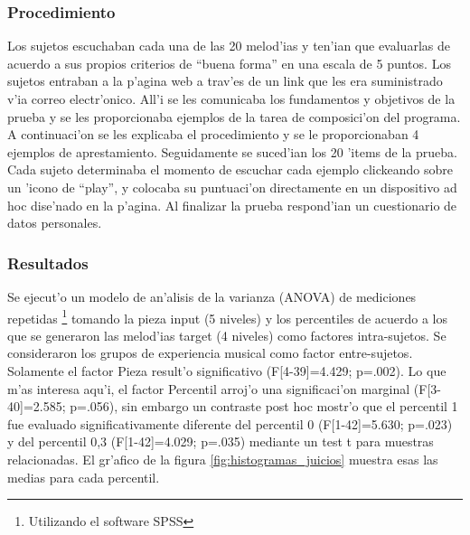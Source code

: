 \subsubsection{Procedimiento}
Los sujetos escuchaban cada una de las 20 melod'ias y ten'ian que evaluarlas de acuerdo a sus propios criterios de ``buena forma'' en una escala de 5 puntos. 
Los sujetos entraban a la p'agina web a trav'es de un link que les era suministrado v'ia correo electr'onico. All'i se les comunicaba los fundamentos y objetivos 
de la prueba y se les proporcionaba ejemplos de la tarea de composici'on del programa. A continuaci'on se les explicaba el procedimiento y se le proporcionaban 4 
ejemplos de aprestamiento. Seguidamente se suced'ian los 20 'items de la prueba. Cada sujeto determinaba el momento de escuchar cada ejemplo clickeando sobre un 
'icono de ``play'', y colocaba su puntuaci'on directamente en un dispositivo ad hoc dise'nado en la p'agina. Al finalizar la prueba respond'ian un 
cuestionario de datos personales. 

\begin{imagen}
    \width{5cm}
\end{imagen}

\subsubsection{Resultados}
Se ejecut'o un modelo de an'alisis de la varianza (ANOVA) de mediciones repetidas \footnote{Utilizando el software SPSS} tomando la pieza input (5 niveles) 
y los percentiles de acuerdo a los que se generaron las melod'ias 
target (4 niveles) como factores intra-sujetos. Se consideraron los grupos de experiencia musical como factor entre-sujetos. 
Solamente el factor Pieza result'o significativo (F[4-39]=4.429; p=.002). Lo que m'as interesa aqu'i, el factor Percentil arroj'o una significaci'on marginal 
(F[3-40]=2.585; p=.056), sin embargo un contraste post hoc mostr'o que el percentil 1 fue evaluado significativamente 
diferente del percentil 0 (F[1-42]=5.630; p=.023) y del percentil 0,3 (F[1-42]=4.029; p=.035) mediante un test t para muestras relacionadas. 
El gr'afico de la figura \ref{fig:histogramas_juicios} muestra esas las medias para cada percentil. 

